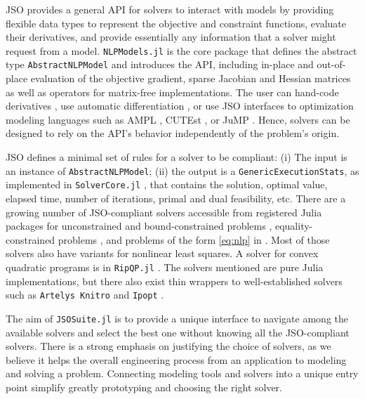 \documentclass{juliacon}
\begin{document}
JSO provides a general API for solvers to interact with models by providing flexible data types to represent the objective and constraint functions, evaluate their derivatives, and provide essentially any information that a solver might request from a model.
%
\texttt{NLPModels.jl} \cite{orban-siqueira-nlpmodels-2020} is the core package that defines the abstract type \texttt{AbstractNLPModel} and introduces the API, including in-place and out-of-place evaluation of the objective gradient, sparse Jacobian and Hessian matrices as well as operators %
for matrix-free implementations.
%
The user can hand-code derivatives %
, use automatic differentiation \cite{orban-siqueira-nlpmodels-2021}, or use JSO interfaces to optimization modeling languages such as AMPL \cite{fourer2003ampl}, CUTEst \cite{cutest}, or JuMP \cite{jump}.
%
Hence, solvers can be designed to rely on the API's behavior independently of the problem's origin. 

JSO defines a minimal set of rules for a solver to be compliant:
(i) The input is an instance of \texttt{AbstractNLPModel};
(ii) the output is a \texttt{GenericExecutionStats}, as implemented in \texttt{SolverCore.jl} \cite{orban-siqueira-solvercore-2021}, that contains the solution, optimal value, elapsed time, number of iterations, primal and dual feasibility, etc.
%
There are a growing number of JSO-compliant solvers accessible from registered Julia packages for unconstrained and bound-constrained problems \cite{Dussault_AdaptiveRegularization_jl_A_unified,orban-siqueira-jsosolvers-2021}, equality-constrained problems \cite{migot2022dcisolver,Migot_FletcherPenaltySolver_jl_2022,Orban_A_regularization_method_2020}, and problems of the form \eqref{eq:nlp} in \cite{percival-jl,shin2023accelerating}.
Most of those solvers also have variants for nonlinear least squares.
A solver for convex quadratic programs is in \texttt{RipQP.jl} \cite{orban-leconte-ripqp-2020}.
The solvers mentioned are pure Julia implementations, but there also exist thin wrappers to well-established solvers such as \texttt{Artelys Knitro} \cite{byrd2006k} and \texttt{Ipopt} \cite{wachter2006implementation}.

The aim of \texttt{JSOSuite.jl} is to provide a unique interface to navigate among the available solvers and select the best one without knowing all the JSO-compliant solvers.
%
There is a strong emphasis on justifying the choice of solvers, as we believe it helps the overall engineering process from an application to modeling and solving a problem.
%
Connecting modeling tools and solvers into a unique entry point simplify greatly prototyping and choosing the right solver.
\end{document}
